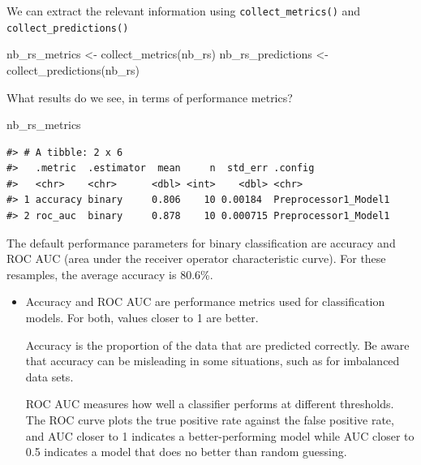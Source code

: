 \documentclass[
]{krantz}
\makeatletter
\newenvironment{Shaded}{\begin{snugshade}}{\end{snugshade}}
\newcommand{\FunctionTok}[1]{\textcolor[rgb]{0.00,0.00,0.00}{#1}}
\newcommand{\NormalTok}[1]{#1}
\newcommand{\OtherTok}[1]{\textcolor[rgb]{0.56,0.35,0.01}{#1}}
\newenvironment{kframe}{%
\medskip{}
\setlength{\fboxsep}{.8em}
 \def\at@end@of@kframe{}%
 \ifinner\ifhmode%
  \def\at@end@of@kframe{\end{minipage}}%
  \begin{minipage}{\columnwidth}%
 \fi\fi%
 \def\FrameCommand##1{\hskip\@totalleftmargin \hskip-\fboxsep
 \colorbox{shadecolor}{##1}\hskip-\fboxsep
     \hskip-\linewidth \hskip-\@totalleftmargin \hskip\columnwidth}%
 \MakeFramed {\advance\hsize-\width
   \@totalleftmargin\z@ \linewidth\hsize
   \@setminipage}}%
 {\par\unskip\endMakeFramed%
 \at@end@of@kframe}
\renewenvironment{Shaded}{\begin{kframe}}{\end{kframe}}
\newenvironment{rmdblock}[1]
  {\begin{shaded*}
  \begin{itemize}[left = -1cm, labelsep = 1cm]
  \renewcommand{\labelitemi}{
    \raisebox{-.7\height}[0pt][0pt]{
      {\setkeys{Gin}{width=3em,keepaspectratio}\texttt{[image: images/\#1]}}
    }
  }
 
  \item
  }
  {
  \end{itemize}
  \end{shaded*}
  }
\newenvironment{rmdnote}
  {\begin{rmdblock}{note}}
  {\end{rmdblock}}
\makeatother
\begin{document}
We can extract the relevant information using \texttt{collect\_metrics()} and \texttt{collect\_predictions()}

\begin{Shaded}
\begin{Highlighting}[]
\NormalTok{nb\_rs\_metrics }\OtherTok{\textless{}{-}} \FunctionTok{collect\_metrics}\NormalTok{(nb\_rs)}
\NormalTok{nb\_rs\_predictions }\OtherTok{\textless{}{-}} \FunctionTok{collect\_predictions}\NormalTok{(nb\_rs)}
\end{Highlighting}
\end{Shaded}

What results do we see, in terms of performance metrics?

\begin{Shaded}
\begin{Highlighting}[]
\NormalTok{nb\_rs\_metrics}
\end{Highlighting}
\end{Shaded}

\begin{verbatim}
#> # A tibble: 2 x 6
#>   .metric  .estimator  mean     n  std_err .config             
#>   <chr>    <chr>      <dbl> <int>    <dbl> <chr>               
#> 1 accuracy binary     0.806    10 0.00184  Preprocessor1_Model1
#> 2 roc_auc  binary     0.878    10 0.000715 Preprocessor1_Model1
\end{verbatim}

The default performance parameters for binary classification are accuracy and ROC AUC (area under the receiver operator characteristic curve). For these resamples, the average accuracy is 80.6\%.


\begin{rmdnote}
Accuracy and ROC AUC are performance metrics used for classification
models. For both, values closer to 1 are better.

Accuracy is the proportion of the data that are predicted correctly. Be
aware that accuracy can be misleading in some situations, such as for
imbalanced data sets.

ROC AUC measures how well a classifier performs at different thresholds.
The ROC curve plots the true positive rate against the false positive
rate, and AUC closer to 1 indicates a better-performing model while AUC
closer to 0.5 indicates a model that does no better than random
guessing.
\end{rmdnote}
\end{document}
